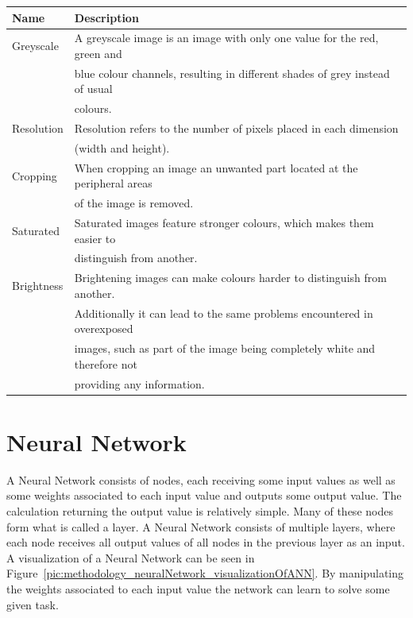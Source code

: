 \begin{table}[h!]
	\begin{tabular}{|l|l|}
		\hline
		\bfseries Name & \bfseries Description \\
		\hline
		Greyscale & A greyscale image is an image with only one value for the red, green and \\
		& blue colour channels, resulting in different shades of grey instead of usual \\
		& colours. \\
		\hline
		Resolution & Resolution refers to the number of pixels placed in each dimension \\
		& (width and height). \\
		\hline
		Cropping & When cropping an image an unwanted part located at the peripheral areas \\
		& of the image is removed. \\
		\hline
		Saturated & Saturated images feature stronger colours, which makes them easier to \\
		& distinguish from another. \\
		\hline
		Brightness & Brightening images can make colours harder to distinguish from another. \\
		& Additionally it can lead to the same problems encountered in overexposed \\
		& images, such as part of the image being completely white and therefore not \\
		& providing any information. \\
		\hline
	\end{tabular}
\end{table}


\section{Neural Network}
A Neural Network consists of nodes, each receiving some input values as well as some weights associated to each input value and outputs some output value. The calculation returning the output value is relatively simple. Many of these nodes form what is called a layer. A Neural Network consists of multiple layers, where each node receives all output values of all nodes in the previous layer as an input. A visualization of a Neural Network can be seen in Figure~\ref{pic:methodology_neuralNetwork_visualizationOfANN}. By manipulating the weights associated to each input value the network can learn to solve some given task.

